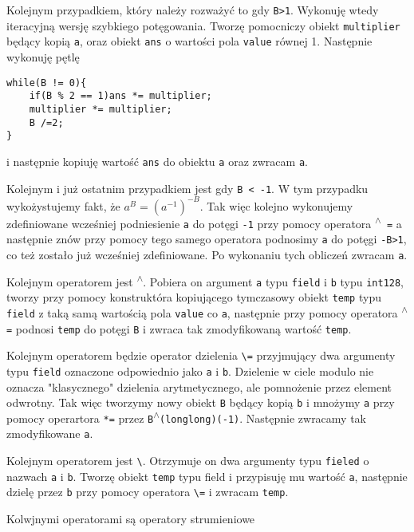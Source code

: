 \documentclass{article}
\begin{document}
Kolejnym przypadkiem, który należy rozważyć to gdy \texttt{B>1}. Wykonuję wtedy iteracyjną wersję szybkiego potęgowania.
Tworzę pomocniczy obiekt \texttt{multiplier} będący kopią \texttt{a}, oraz obiekt \texttt{ans} o
wartości pola \texttt{value} równej 1. Następnie wykonuję pętlę
\begin{lstlisting}
while(B != 0){
    if(B % 2 == 1)ans *= multiplier;
    multiplier *= multiplier;
    B /=2;
}
\end{lstlisting}
i następnie kopiuję wartość \texttt{ans} do obiektu \texttt{a} oraz zwracam \texttt{a}.

Kolejnym i już ostatnim przypadkiem jest gdy \texttt{B < -1}. W tym przypadku wykożystujemy 
fakt, że $a^B=(a^{-1})^{-B}$. Tak więc kolejno wykonujemy zdefiniowane wcześniej 
podniesienie \texttt{a} do potęgi \texttt{-1} przy pomocy operatora \texttt{\textsuperscript{$\wedge$} =} 
a następnie znów przy
pomocy tego samego operatora podnosimy \texttt{a} do potęgi \texttt{-B>1}, co też zostało już 
wcześniej zdefiniowane. Po wykonaniu tych obliczeń zwracam \texttt{a}.

Kolejnym operatorem jest \texttt{\textsuperscript{$\wedge$}}. Pobiera on argument \texttt{a} typu 
\texttt{field} i \texttt{b} typu 
\texttt{\textunderscore \textunderscore int128}, tworzy
przy pomocy konstruktóra kopiującego tymczasowy obiekt \texttt{temp} typu \texttt{field} z taką 
samą wartością pola 
\texttt{value} co \texttt{a}, następnie przy pomocy operatora 
\texttt{\textsuperscript{$\wedge$}=} podnosi 
\texttt{temp} do potęgi \texttt{B} i zwraca tak zmodyfikowaną wartość \texttt{temp}.

Kolejnym operatorem będzie operator dzielenia \texttt{\textbackslash=} przyjmujący dwa argumenty typu 
\texttt{field} oznaczone odpowiednio jako \texttt{a} i \texttt{b}. Dzielenie w ciele modulo nie oznacza
"klasycznego" dzielenia arytmetycznego, ale pomnożenie przez element odwrotny. 
Tak więc tworzymy nowy obiekt \texttt{B} będący kopią \texttt{b} i mnożymy \texttt{a} przy pomocy
operartora \texttt{*=} przez \texttt{B\textsuperscript{$\wedge$}(long$ $long)(-1)}. Następnie zwracamy tak zmodyfikowane \texttt{a}.

Kolejnym operatorem jest \texttt{\textbackslash}. Otrzymuje on dwa argumenty typu \texttt{fieled} o nazwach \texttt{a} i 
\texttt{b}. Tworzę obiekt \texttt{temp} typu field i przypisuję mu wartość \texttt{a}, następnie dzielę przez \texttt{b} przy pomocy 
operatora \texttt{\textbackslash=} i zwracam \texttt{temp}.

Kolwjnymi operatorami są operatory strumieniowe
\end{document}
